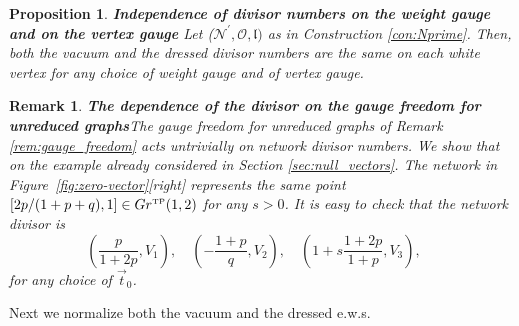 \documentclass[11pt]{amsart}
\theoremstyle{plain}
\numberwithin{equation}{section}
\newtheorem{proposition}[theorem]{Proposition}
\newtheorem{remark}{Remark}[subsection]
\begin{document}
\begin{proposition}\label{prop:gauge}\textbf{Independence of divisor numbers on the weight gauge and on the vertex gauge}
Let ($\mathcal N^{\prime}, \mathcal O, \mathfrak l)$ as in Construction \ref{con:Nprime}. Then, both the vacuum and the dressed divisor numbers are the same on each white vertex for any choice of weight gauge and of vertex gauge.
\end{proposition}

\begin{remark}\textbf{The dependence of the divisor on the gauge freedom for unreduced graphs}\label{rem:div_unred}
The gauge freedom for unreduced graphs of Remark \ref{rem:gauge_freedom} acts untrivially on network divisor numbers.
We show that on the example already considered in Section \ref{sec:null_vectors}. The network in Figure~\ref{fig:zero-vector}[right] represents the same point $[ 2p/(1+p+q),1] \in Gr^{\mbox{\tiny TP}}(1,2)$ for any $s>0$. It is easy to check that the network divisor is
\[
\left( \frac{p}{1+2p}, V_1\right), \quad \left( -\frac{1+p}{q}, V_2\right), \quad \left( 1+s\frac{1+2p}{1+p}, V_3\right), \quad
\] 
for any choice of $\vec t_0$.
\end{remark}

Next we normalize both the vacuum and the dressed e.w.s. 
\end{document}
